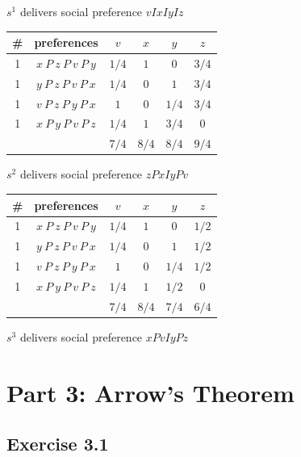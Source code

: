 \documentclass[a4paper]{article}
\begin{document}
$s^1$ delivers social preference $vIxIyIz$

\begin{table}[!htbp]
    \centering
    \begin{tabular}{c|c|cccc|}
        \# & preferences                  & $v$  & $x$  & $y$  & $z$ \\ 
        \hline
        1  & $x\: P\: z\: P\: v\: P\: y$  & $1/4$  & $1$  & $0$  & $3/4$ \\
        1  & $y\: P\: z\: P\: v\: P\: x$  & $1/4$  & $0$  & $1$  & $3/4$ \\
        1  & $v\: P\: z\: P\: y\: P\: x$  & $1$  & $0$  & $1/4$  & $3/4$ \\
        1  & $x\: P\: y\: P\: v\: P\: z$  & $1/4$  & $1$  & $3/4$  & $0$ \\
        \hline
           &                              & $7/4$ & $8/4$  & $8/4$  & $9/4$ \\
        \hline
    \end{tabular}
\end{table}

$s^2$ delivers social preference $zPxIyPv$

\begin{table}[!htbp]
    \centering
    \begin{tabular}{c|c|cccc|}
        \# & preferences                  & $v$  & $x$  & $y$  & $z$ \\ 
        \hline
        1  & $x\: P\: z\: P\: v\: P\: y$  & $1/4$  & $1$  & $0$  & $1/2$ \\
        1  & $y\: P\: z\: P\: v\: P\: x$  & $1/4$  & $0$  & $1$  & $1/2$ \\
        1  & $v\: P\: z\: P\: y\: P\: x$  & $1$  & $0$  & $1/4$  & $1/2$ \\
        1  & $x\: P\: y\: P\: v\: P\: z$  & $1/4$  & $1$  & $1/2$  & $0$ \\
        \hline
           &                              & $7/4$ & $8/4$  & $7/4$  & $6/4$ \\
        \hline
    \end{tabular}
\end{table}

$s^3$ delivers social preference $xPvIyPz$

\section*{Part 3: Arrow's Theorem}

\subsection*{Exercise 3.1}
\end{document}
